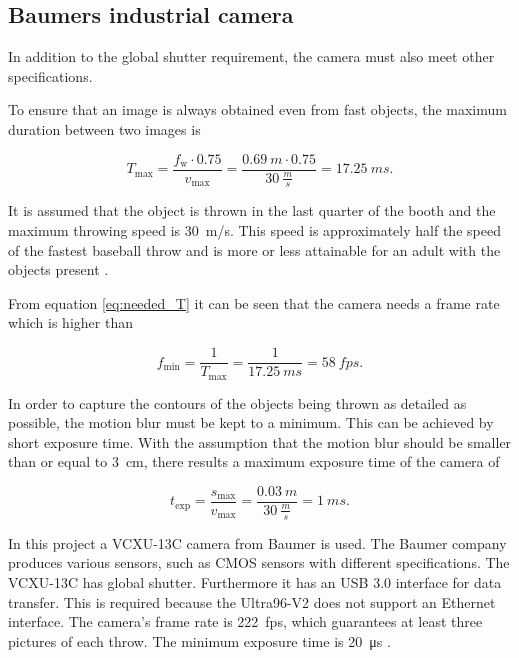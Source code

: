 \subsection{Baumers industrial camera}
\label{subsec:baumer_cam}

In addition to the global shutter requirement, the camera must also meet other specifications.

To ensure that an image is always obtained even from fast objects, the maximum duration between two images is

\begin{equation}
  T_\text{max} = \frac{f_\text{w} \cdot 0.75}{v_\text{max}} = \frac{\SI{0.69}{m} \cdot 0.75}{\SI{30}{\frac{m}{s}}} = \SI{17.25}{ms}.
  \label{eq:needed_T}
\end{equation}

It is assumed that the object is thrown in the last quarter of the booth and the maximum throwing speed is \SI{30}{m/s}.
This speed is approximately half the speed of the fastest baseball throw and is more or less attainable for an adult with the objects present \cite{speed_baseball}.

From equation \ref{eq:needed_T} it can be seen that the camera needs a frame rate which is higher than

\begin{equation}
  f_\text{min} = \frac{1}{T_\text{max}} = \frac{1}{\SI{17.25}{ms}} = \SI{58}{fps}.
  \label{eq:needed_fps}
\end{equation}

In order to capture the contours of the objects being thrown as detailed as possible, the motion blur must be kept to a minimum. 
This can be achieved by short exposure time. 
With the assumption that the motion blur should be smaller than or equal to \SI{3}{cm}, there results a maximum exposure time of the camera of

\begin{equation}
  t_\text{exp} = \frac{s_\text{max}}{v_\text{max}} = \frac{\SI{0.03}{m}}{\SI{30}{\frac{m}{s}}} = \SI{1}{ms}.
  \label{eq:texp}
\end{equation}

In this project a VCXU-13C camera from Baumer is used.
The Baumer company produces various sensors, such as CMOS sensors with different specifications.
The VCXU-13C has global shutter.
Furthermore it has an USB 3.0 interface for data transfer.
This is required because the Ultra96-V2 does not support an Ethernet interface.
The camera's frame rate is \SI{222}{fps}, which guarantees at least three pictures of each throw.
The minimum exposure time is \SI{20}{\micro s} \cite{baumer_cam}.

